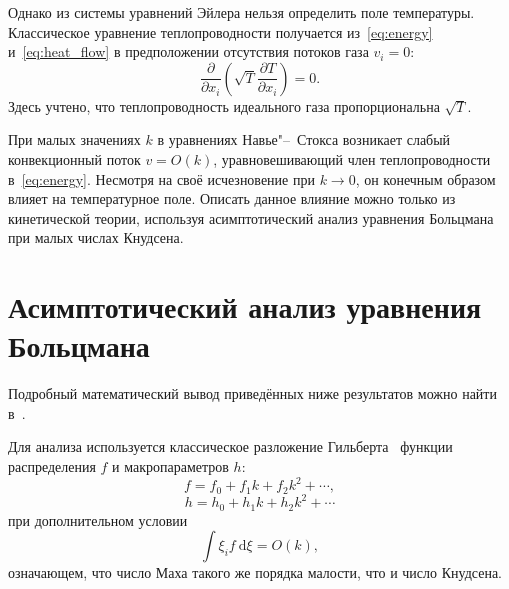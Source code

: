 \documentclass[english,russian,a4paper,10pt]{article}
\newcommand{\dd}{\:\mathrm{d}}
\newcommand{\pder}[2][]{\frac{\partial#1}{\partial#2}}
\begin{document}
Однако из системы уравнений Эйлера нельзя определить поле температуры.
Классическое уравнение теплопроводности получается из~\eqref{eq:energy} и~\eqref{eq:heat_flow}
в предположении отсутствия потоков газа \(v_i = 0\):
\begin{equation}\label{eq:heat_equation}
	\pder{x_i}\left(\sqrt{T}\pder[T]{x_i}\right) = 0.
\end{equation}
Здесь учтено, что теплопроводность идеального газа пропорциональна \(\sqrt{T}\).

При малых значениях \(k\) в уравнениях Навье"--~Стокса возникает слабый конвекционный поток \(v=O(k)\),
уравновешивающий член теплопроводности в~\eqref{eq:energy}.
Несмотря на своё исчезновение при \(k\to0\), он конечным образом влияет на температурное поле.
Описать данное влияние можно только из кинетической теории, используя асимптотический анализ 
уравнения Больцмана при малых числах Кнудсена.

\section{Асимптотический анализ уравнения Больцмана}
Подробный математический вывод приведённых ниже результатов можно найти в~\cite{Sone2002}.

Для анализа используется классическое разложение Гильберта~\cite{Hilbert1912}
функции распределения \(f\) и макропараметров \(h\):
\[ f = f_0 + f_1k + f_2k^2 + \cdots, \]
\[ h = h_0 + h_1k + h_2k^2 + \cdots \]
при дополнительном условии
\begin{equation}\label{eq:Mach_constraint}
	\int\xi_if\dd\xi = O(k),
\end{equation}
означающем, что число Маха такого же порядка малости, что и число Кнудсена.
\end{document}
